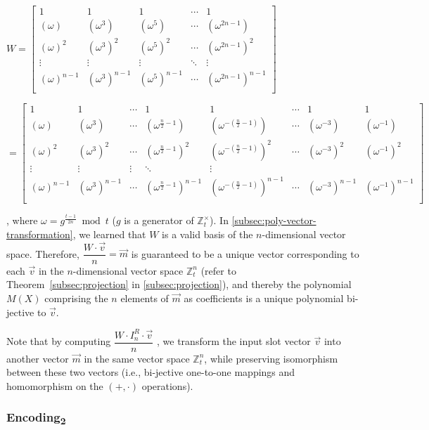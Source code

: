 $W =  \begin{bmatrix}
1 & 1 & 1 & \cdots & 1\\
(\omega) & (\omega^3) & (\omega^5) & \cdots & (\omega^{2n-1})\\
(\omega)^2 & (\omega^3)^2 & (\omega^5)^2 & \cdots & (\omega^{2n-1})^2\\
\vdots & \vdots & \vdots & \ddots & \vdots \\
(\omega)^{n-1} & (\omega^3)^{n-1} & (\omega^5)^{n-1} & \cdots & (\omega^{2n-1})^{n-1}\\
\end{bmatrix}$

$= \begin{bmatrix}
1 & 1 & \cdots & 1 & 1 & \cdots & 1 & 1\\
(\omega) & (\omega^3) & \cdots & (\omega^{\frac{n}{2} - 1}) & (\omega^{-(\frac{n}{2} - 1)}) & \cdots & (\omega^{-3}) & (\omega^{-1})\\
(\omega)^2 & (\omega^3)^2 & \cdots & (\omega^{\frac{n}{2} - 1})^2 & (\omega^{-(\frac{n}{2} - 1)})^2 & \cdots & (\omega^{-3})^2 & (\omega^{-1})^2\\
\vdots & \vdots & \vdots & \ddots & \vdots \\
(\omega)^{n-1} & (\omega^3)^{n-1} & \cdots & (\omega^{\frac{n}{2} - 1})^{n-1} & (\omega^{-(\frac{n}{2} - 1)})^{n-1} & \cdots & (\omega^{-3})^{n-1} & (\omega^{-1})^{n-1}\\
\end{bmatrix}$

, where $\omega = g^{\frac{t - 1}{2n}} \bmod t$ ($g$ is a generator of $\mathbb{Z}_t^{\times}$). In \autoref{subsec:poly-vector-transformation}, we learned that $W$ is a valid basis of the $n$-dimensional vector space. Therefore, $\dfrac{W \cdot \vec{v}}{n} = \vec{m}$ is guaranteed to be a unique vector corresponding to each $\vec{v}$ in the $n$-dimensional vector space $\mathbb{Z}_t^{n}$ (refer to Theorem~\ref*{subsec:projection} in \autoref{subsec:projection}), and thereby the polynomial $M(X)$ comprising the $n$ elements of $\vec{m}$ as coefficients is a unique polynomial bi-jective to $\vec{v}$. 

Note that by computing $\dfrac{W \cdot I_n^R \cdot \vec{v}}{n}$
, we transform the input slot vector $\vec{v}$ into another vector $\vec{m}$ in the same vector space $\mathbb{Z}_t^{n}$, while preserving isomorphism between these two vectors (i.e., bi-jective one-to-one mappings and homomorphism on the $(+, \cdot)$ operations). 

\subsubsection{\textsf{Encoding\textsubscript{2}}}  

